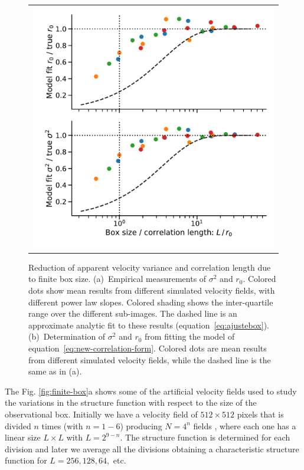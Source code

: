 \documentclass[fleqn,usenatbib, useAMS, a4paper]{mnras}
\begin{document}
\begin{figure}
\begin{tabular}{@{} l @{}}
    \includegraphics[width=0.95\linewidth]{Figures/fake-finite-box-fits}
  \end{tabular}
  \caption{
    Reduction of apparent velocity variance and correlation length
    due to finite box size.
    (a)~Empirical measurements of \(\sigma^2\) and \(r_0\).
    Colored dots show mean results from different simulated velocity fields,
    with different power law slopes.
    Colored shading shows the inter-quartile range over the different sub-images.
    The dashed line is an approximate analytic fit to these results
    (equation~\eqref{eq:ajustebox}).
    (b)~Determination of \(\sigma^2\) and \(r_0\) from fitting the model
    of equation~\eqref{eq:new-correlation-form}.
    Colored dots are mean results from different simulated velocity fields,
    while the dashed line is the same as in (a).
  }
  \label{fig:finite-box-effect}
\end{figure}

The Fig. \ref{fig:finite-box}a shows some of the artificial velocity fields used to study the variations in the structure function with respect to the size of the observational box.
Initially we have a velocity field of \(512 \times 512 \) pixels that is divided \(n\) times (with \(n = 1 - 6\)) producing \(N = 4^n\) fields , where each one has a linear size \(L \times L \) with \(L = 2^{9 -n}\).
The structure function is determined for each division and later we average all the divisions obtaining a characteristic structure function for \(L = 256, 128, 64,\) etc. 
\end{document}
